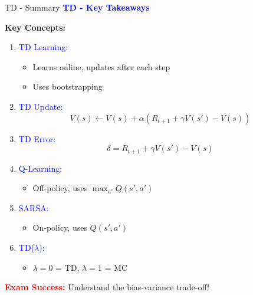 \documentclass[8pt]{beamer}
\begin{document}
	\begin{frame}{TD - Summary}
		\fontsize{6.5}{7.5}\selectfont
		\textcolor{blue}{\textbf{TD - Key Takeaways}}
		
		\textbf{Key Concepts:}
		\begin{enumerate}
			\item \textcolor{blue}{TD Learning:}
			\begin{itemize}
				\item Learns online, updates after each step
				\item Uses bootstrapping
			\end{itemize}
			
			\item \textcolor{blue}{TD Update:}
			\[
			V(s) \leftarrow V(s) + \alpha(R_{t+1} + \gamma V(s') - V(s))
			\]
			
			\item \textcolor{blue}{TD Error:}
			\[
			\delta = R_{t+1} + \gamma V(s') - V(s)
			\]
			
			\item \textcolor{blue}{Q-Learning:}
			\begin{itemize}
				\item Off-policy, uses $\max_{a'} Q(s',a')$
			\end{itemize}
			
			\item \textcolor{blue}{SARSA:}
			\begin{itemize}
				\item On-policy, uses $Q(s',a')$
			\end{itemize}
			
			\item \textcolor{blue}{TD($\lambda$):}
			\begin{itemize}
				\item $\lambda=0$ = TD, $\lambda=1$ = MC
			\end{itemize}
		\end{enumerate}
		
		\textcolor{red}{\textbf{Exam Success:}} Understand the bias-variance trade-off!
	\end{frame}
	
	
\end{document}
